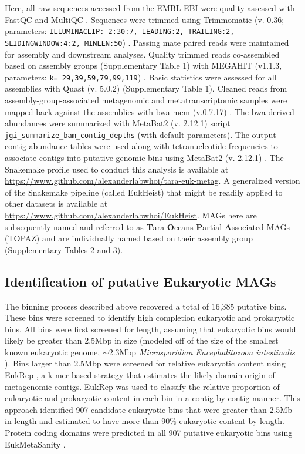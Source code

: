 \documentclass[12pt]{article}
\numberwithin{equation}{section}
\begin{document}
Here, all raw sequences accessed from the EMBL-EBI were quality assessed with FastQC and MultiQC \citep{Andrews2010FastQC}. Sequences were trimmed using Trimmomatic (v. 0.36; parameters: \texttt{ILLUMINACLIP: 2:30:7, LEADING:2, TRAILING:2, SLIDINGWINDOW:4:2, MINLEN:50}) \citep{Bolger2014Trimmomatic}. Passing mate paired reads were maintained for assembly and downstream analyses. Quality trimmed reads co-assembled based on assembly groups (Supplementary Table 1) with MEGAHIT (v1.1.3, parameters: \texttt{k= 29,39,59,79,99,119}) \citep{Li2015MEGAHIT}. Basic statistics were assessed for all assemblies with Quast (v. 5.0.2) \citep{Gurevich_2013} (Supplementary Table 1). Cleaned reads from assembly-group-associated metagenomic and metatranscriptomic samples were mapped back against the assemblies with bwa mem (v.0.7.17) \citep{Li2010Fast}. The bwa-derived abundances were summarized with MetaBat2 (v. 2.12.1) script \texttt{jgi\_summarize\_bam\_contig\_depths} (with default parameters). The output contig abundance tables were used along with tetranucleotide frequencies to associate contigs into putative genomic bins using MetaBat2 (v. 2.12.1) \citep{Kang_2019}. The Snakemake profile used to conduct this analysis is available at \url{https://www.github.com/alexanderlabwhoi/tara-euk-metag}. A generalized version of the Snakemake pipeline (called EukHeist) that might be readily applied to other datasets is available at \url{https://www.github.com/alexanderlabwhoi/EukHeist}. MAGs here are subsequently named and referred to as \textbf{T}ara \textbf{O}ceans \textbf{P}artial \textbf{A}ssociated MAGs (TOPAZ) and are individually named based on their assembly group (Supplementary Tables 2 and 3).

\subsection*{Identification of putative Eukaryotic MAGs} The binning process described above recovered a total of 16,385 putative bins. These bins were screened to identify high completion eukaryotic and prokaryotic bins. All bins were first screened for length, assuming that eukaryotic bins would likely be greater than 2.5Mbp in size (modeled off of the size of the smallest known eukaryotic genome, $\sim 2.3$Mbp \textit{Microsporidian Encephalitozoon intestinalis} \citep{Corradi2010complete}). Bins larger than 2.5Mbp were screened for relative eukaryotic content using EukRep \citep{West2018Genome-reconstruction}, a k-mer based strategy that estimates the likely domain-origin of metagenomic contigs. EukRep was used to classify the relative proportion of eukaryotic and prokaryotic content in each bin in a contig-by-contig manner. This approach identified 907 candidate eukaryotic bins that were greater than 2.5Mb in length and estimated to have more than 90\% eukaryotic content by length. Protein coding domains were predicted in all 907 putative eukaryotic bins using EukMetaSanity \citep{EukMS}. 
\end{document}
